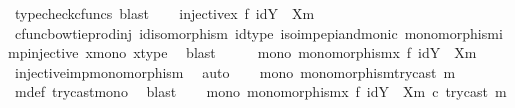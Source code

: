 \begin{isabellebody}
\ {\isacharparenleft}{\kern0pt}typecheck{\isacharunderscore}{\kern0pt}cfuncs{\isacharcomma}{\kern0pt}\ blast{\isacharparenright}{\kern0pt}\isanewline
\isanewline
\ \ \isamarkupfalse%
\ {\isachardoublequoteopen}injective{\isacharparenleft}{\kern0pt}x\ {\isasymbowtie}\isactrlsub f\ id{\isacharparenleft}{\kern0pt}Y\ {\isasymsetminus}\ {\isacharparenleft}{\kern0pt}X{\isacharcomma}{\kern0pt}m{\isacharparenright}{\kern0pt}{\isacharparenright}{\kern0pt}{\isacharparenright}{\kern0pt}{\isachardoublequoteclose}\isanewline
\ \ \ \ \isamarkupfalse%
\ cfunc{\isacharunderscore}{\kern0pt}bowtieprod{\isacharunderscore}{\kern0pt}inj\ id{\isacharunderscore}{\kern0pt}isomorphism\ id{\isacharunderscore}{\kern0pt}type\ iso{\isacharunderscore}{\kern0pt}imp{\isacharunderscore}{\kern0pt}epi{\isacharunderscore}{\kern0pt}and{\isacharunderscore}{\kern0pt}monic\ monomorphism{\isacharunderscore}{\kern0pt}imp{\isacharunderscore}{\kern0pt}injective\ x{\isacharunderscore}{\kern0pt}mono\ x{\isacharunderscore}{\kern0pt}type\ \isamarkupfalse%
\ blast\isanewline
\ \ \isamarkupfalse%
\ \isamarkupfalse%
\ mono{}{\isacharcolon}{\kern0pt}\ {\isachardoublequoteopen}monomorphism{\isacharparenleft}{\kern0pt}x\ {\isasymbowtie}\isactrlsub f\ id{\isacharparenleft}{\kern0pt}Y\ {\isasymsetminus}\ {\isacharparenleft}{\kern0pt}X{\isacharcomma}{\kern0pt}m{\isacharparenright}{\kern0pt}{\isacharparenright}{\kern0pt}{\isacharparenright}{\kern0pt}{\isachardoublequoteclose}\isanewline
\ \ \ \ \isamarkupfalse%
\ injective{\isacharunderscore}{\kern0pt}imp{\isacharunderscore}{\kern0pt}monomorphism\ \isamarkupfalse%
\ auto\isanewline
\ \ \isamarkupfalse%
\ mono{}{\isacharcolon}{\kern0pt}\ {\isachardoublequoteopen}monomorphism{\isacharparenleft}{\kern0pt}try{\isacharunderscore}{\kern0pt}cast\ m{\isacharparenright}{\kern0pt}{\isachardoublequoteclose}\isanewline
\ \ \ \ \isamarkupfalse%
\ m{\isacharunderscore}{\kern0pt}def\ try{\isacharunderscore}{\kern0pt}cast{\isacharunderscore}{\kern0pt}mono\ \isamarkupfalse%
\ blast\isanewline
\ \ \isamarkupfalse%
\ mono{}{\isacharcolon}{\kern0pt}\ {\isachardoublequoteopen}monomorphism{\isacharparenleft}{\kern0pt}{\isacharparenleft}{\kern0pt}x\ {\isasymbowtie}\isactrlsub f\ id{\isacharparenleft}{\kern0pt}Y\ {\isasymsetminus}\ {\isacharparenleft}{\kern0pt}X{\isacharcomma}{\kern0pt}m{\isacharparenright}{\kern0pt}{\isacharparenright}{\kern0pt}{\isacharparenright}{\kern0pt}\ {\isasymcirc}\isactrlsub c\ try{\isacharunderscore}{\kern0pt}cast\ m{\isacharparenright}{\kern0pt}{\isachardoublequoteclose}\isanewline

\end{isabellebody}
